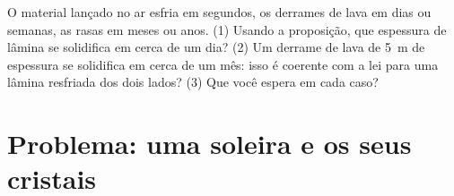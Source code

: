 \begin{exercise}[$\star\star\star$]\label{exo:g11:igneous-rocks:15}
O material lançado no ar esfria em segundos, os derrames de lava em dias ou
semanas, as  rasas em meses ou anos. (1) Usando a proposição, que
espessura de lâmina se solidifica em cerca de um dia? (2) Um derrame de lava
de \qty{5}{m} de espessura se solidifica em cerca de um mês: isso é coerente
com a lei para uma lâmina resfriada dos dois lados? (3) Que  você
espera em cada caso?
\end{exercise}

\section{Problema: uma soleira e os seus cristais}

